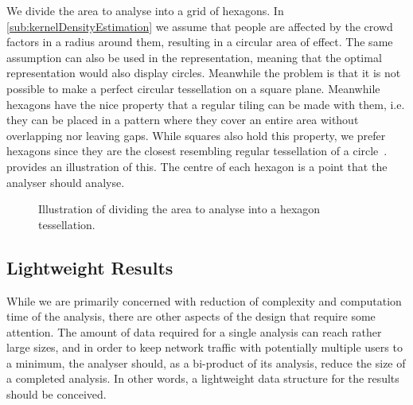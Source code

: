 We divide the area to analyse into a grid of hexagons. In \cref{sub:kernelDensityEstimation} we assume that people are affected by the crowd factors in a radius around them, resulting in a circular area of effect. The same assumption can also be used in the representation, meaning that the optimal representation would also display circles. Meanwhile the problem is that it is not possible to make a perfect circular tessellation on a square plane. Meanwhile hexagons have the nice property that a regular tiling can be made with them, i.e. they can be placed in a pattern where they cover an entire area without overlapping nor leaving gaps. While squares also hold this property, we prefer hexagons since they are the closest resembling regular tessellation of a circle~\cite{circletessellation}.  provides an illustration of this. The centre of each hexagon is a point that the analyser should analyse.

\begin{figure}[htbp]
\centering
{}
\caption{Illustration of dividing the area to analyse into a hexagon tessellation.}\label{fig:analysis_hexagon_divide}
\end{figure}


\subsection{Lightweight Results}
\label{subsec:lightweightResults}
While we are primarily concerned with reduction of complexity and computation time of the analysis, there are other aspects of the design that require some attention. The amount of data required for a single analysis can reach rather large sizes, and in order to keep network traffic with potentially multiple users to a minimum, the analyser should, as a bi-product of its analysis, reduce the size of a completed analysis. In other words, a lightweight data structure for the results should be conceived. 

